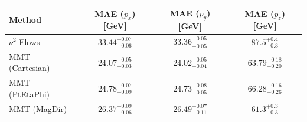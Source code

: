     \begin{tabular}{lccc}
        \toprule
        Method & MAE ($p_x$) [GeV] & MAE ($p_y$) [GeV] & MAE ($p_z$) [GeV] \\
        \midrule
        $\nu^2$-Flows & $33.44^{+0.07}_{-0.06}$ & $33.36^{+0.05}_{-0.05}$ & $87.5^{+0.4}_{-0.3}$ \\
        MMT (Cartesian) & $24.07^{+0.05}_{-0.03}$ & $24.02^{+0.05}_{-0.04}$ & $63.79^{+0.18}_{-0.20}$ \\
        MMT (PtEtaPhi) & $24.78^{+0.07}_{-0.09}$ & $24.73^{+0.08}_{-0.05}$ & $66.28^{+0.16}_{-0.26}$ \\
        MMT (MagDir) & $26.37^{+0.09}_{-0.06}$ & $26.49^{+0.07}_{-0.11}$ & $61.3^{+0.3}_{-0.3}$ \\
        \bottomrule
    \end{tabular}